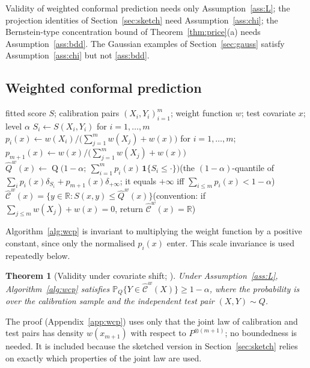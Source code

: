 \documentclass[11pt,a4paper]{article}
\newcommand{\Prob}{\mathbb{P}}
\newcommand{\R}{\mathbb{R}}
\newcommand{\Cset}{\widehat{\mathcal C}}
\newcommand{\ind}{\mathbf 1}
\DeclareMathOperator{\Qf}{Q}
\theoremstyle{plain}
\newtheorem{theorem}{Theorem}[section]
\theoremstyle{definition}
\theoremstyle{remark}
\begin{document}
Validity of weighted conformal prediction needs only Assumption~\ref{ass:L}; the projection identities of Section~\ref{sec:sketch} need Assumption~\ref{ass:chi}; the Bernstein-type concentration bound of Theorem~\ref{thm:price}(a) needs Assumption~\ref{ass:bdd}. The Gaussian examples of Section~\ref{sec:gauss} satisfy Assumption~\ref{ass:chi} but not \ref{ass:bdd}.

\subsection{Weighted conformal prediction}

\begin{algorithm}[!htb]
\caption{Weighted split conformal prediction \cite{tibshirani2019}}\label{alg:wcp}
\begin{algorithmic}[1]
\Require fitted score $S$; calibration pairs $(X_i,Y_i)_{i=1}^m$; weight function $w$; test covariate $x$; level $\alpha$
\State $S_i\gets S(X_i,Y_i)$ for $i=1,\dots,m$
\State $p_i(x)\gets w(X_i)\big/\bigl(\sum_{j=1}^m w(X_j)+w(x)\bigr)$ for $i=1,\dots,m$;\quad $p_{m+1}(x)\gets w(x)\big/\bigl(\sum_{j=1}^m w(X_j)+w(x)\bigr)$
\State $\widehat Q^w(x)\gets\Qf\bigl(1-\alpha;\ \sum_{i=1}^m p_i(x)\,\ind\{S_i\le\cdot\}\bigr)$\quad(the $(1-\alpha)$-quantile of $\sum_i p_i(x)\delta_{S_i}+p_{m+1}(x)\delta_{+\infty}$; it equals $+\infty$ iff $\sum_{i\le m}p_i(x)<1-\alpha$)
\State \Return $\Cset^w(x)=\{y\in\R:S(x,y)\le\widehat Q^w(x)\}$\quad(convention: if $\sum_{j\le m}w(X_j)+w(x)=0$, return $\Cset^w(x)=\R$)
\end{algorithmic}
\end{algorithm}

Algorithm~\ref{alg:wcp} is invariant to multiplying the weight function by a positive constant, since only the normalised $p_i(x)$ enter. This scale invariance is used repeatedly below.

\begin{theorem}[Validity under covariate shift; \cite{tibshirani2019}]\label{thm:wcp}
Under Assumption~\ref{ass:L}, Algorithm~\ref{alg:wcp} satisfies $\Prob_Q\{Y\in\Cset^w(X)\}\ge1-\alpha$, where the probability is over the calibration sample and the independent test pair $(X,Y)\sim Q$.
\end{theorem}

The proof (Appendix~\ref{app:wcp}) uses only that the joint law of calibration and test pairs has density $w(x_{m+1})$ with respect to $P^{\otimes(m+1)}$; no boundedness is needed. It is included because the sketched version in Section~\ref{sec:sketch} relies on exactly which properties of the joint law are used.
\end{document}
